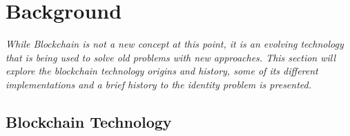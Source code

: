 \documentclass[notitlepage]{llncs}
\begin{document}

\section{Background} \label{background}

\textit{While Blockchain is not a new concept at this point, it is an evolving technology that is being used to solve old problems with new approaches. This section will explore the blockchain technology origins and history, some of its different implementations and a brief history to the identity problem is presented. }

\subsection{Blockchain Technology}
\end{document}

